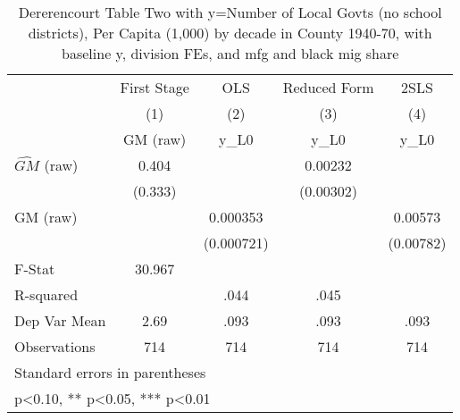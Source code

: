 \begin{table}[htbp]\centering
\def\sym#1{\ifmmode^{#1}\else\(^{#1}\)\fi}
\caption{Dererencourt Table Two with y=Number of Local Govts (no school districts), Per Capita (1,000) by decade in County 1940-70, with baseline y, division FEs, and mfg and black mig share}
\begin{tabular}{l*{4}{c}}
\toprule
                    & First Stage   &         OLS   &Reduced Form   &        2SLS   \\
                    &\multicolumn{1}{c}{(1)}&\multicolumn{1}{c}{(2)}&\multicolumn{1}{c}{(3)}&\multicolumn{1}{c}{(4)}\\
                    &\multicolumn{1}{c}{GM  (raw)}&\multicolumn{1}{c}{y\_L0}&\multicolumn{1}{c}{y\_L0}&\multicolumn{1}{c}{y\_L0}\\
\midrule
$\hat{GM}$ (raw)    &       0.404   &               &     0.00232   &               \\
                    &     (0.333)   &               &   (0.00302)   &               \\
\addlinespace
GM  (raw)           &               &    0.000353   &               &     0.00573   \\
                    &               &  (0.000721)   &               &   (0.00782)   \\
\midrule
F-Stat              &      30.967   &               &               &               \\
R-squared           &               &        .044   &        .045   &               \\
Dep Var Mean        &        2.69   &        .093   &        .093   &        .093   \\
Observations        &         714   &         714   &         714   &         714   \\
\bottomrule
\multicolumn{5}{l}{\footnotesize Standard errors in parentheses}\\
\multicolumn{5}{l}{\footnotesize * p<0.10, ** p<0.05, *** p<0.01}\\
\end{tabular}
\end{table}
